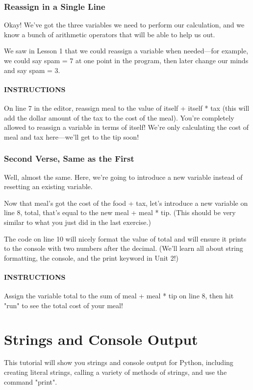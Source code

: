 \documentclass[12pt,a4paper,final,twoside,onecolumn,titlepage]{book}
\begin{document}
\subsection{Reassign in a Single Line}
Okay! We've got the three variables we need to perform our calculation, and we know a bunch of arithmetic operators that will be able to help us out.

We saw in Lesson 1 that we could reassign a variable when needed—for example, we could say spam = 7 at one point in the program, then later change our minds and say spam = 3.

\subsubsection{INSTRUCTIONS}
On line 7 in the editor, reassign meal to the value of itself + itself * tax (this will add the dollar amount of the tax to the cost of the meal). You're completely allowed to reassign a variable in terms of itself!
We're only calculating the cost of meal and tax here—we'll get to the tip soon!

\subsection{Second Verse, Same as the First}
Well, almost the same. Here, we're going to introduce a new variable instead of resetting an existing variable.

Now that meal's got the cost of the food + tax, let's introduce a new variable on line 8, total, that's equal to the new meal + meal * tip. (This should be very similar to what you just did in the last exercise.)

The code on line 10 will nicely format the value of total and will ensure it prints to the console with two numbers after the decimal. (We'll learn all about string formatting, the console, and the print keyword in Unit 2!)

\subsubsection{INSTRUCTIONS}
Assign the variable total to the sum of meal + meal * tip on line 8, then hit "run" to see the total cost of your meal!

\chapter{Strings and Console Output}
This tutorial will show you strings and console output for Python, including creating literal strings, calling a variety of methods of strings, and use the command "print".
\end{document}

